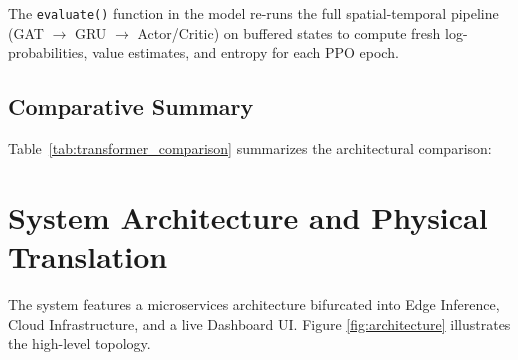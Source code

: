 \documentclass[12pt, onecolumn]{IEEEtran}
\begin{document}
The \texttt{evaluate()} function in the model re-runs the full spatial-temporal pipeline (GAT $\to$ GRU $\to$ Actor/Critic) on buffered states to compute fresh log-probabilities, value estimates, and entropy for each PPO epoch.

\subsection{Comparative Summary}
Table~\ref{tab:transformer_comparison} summarizes the architectural comparison:

\begin{table}[H]
\centering
\caption{Architectural Comparison: Full Transformer vs. STGAT}
\label{tab:transformer_comparison}
\end{table}


\section{System Architecture and Physical Translation}

The system features a microservices architecture bifurcated into Edge Inference, Cloud Infrastructure, and a live Dashboard UI. Figure \ref{fig:architecture} illustrates the high-level topology.
\end{document}
